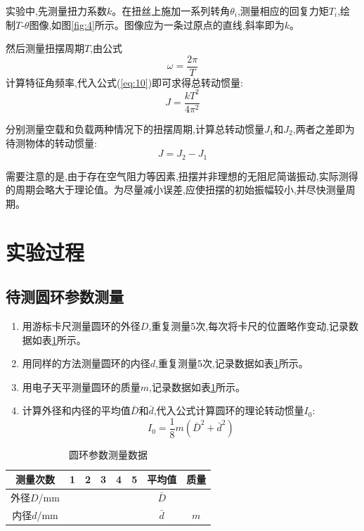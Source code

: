 \documentclass[UTF8]{ctexart}
\begin{document}
    实验中,先测量扭力系数$k$。在扭丝上施加一系列转角$\theta_i$,测量相应的回复力矩$T_i$,绘制$T$-$\theta$图像,如图\ref{fig:4}所示。图像应为一条过原点的直线,斜率即为$k$。
    
    然后测量扭摆周期$T$,由公式
    \begin{equation}
    \omega=\frac{2\pi}{T} \label{eq:11}
    \end{equation}
    计算特征角频率,代入公式(\ref{eq:10})即可求得总转动惯量:
    \begin{equation}
    J=\frac{kT^2}{4\pi^2} \label{eq:12}
    \end{equation}
    
    分别测量空载和负载两种情况下的扭摆周期,计算总转动惯量$J_1$和$J_2$,两者之差即为待测物体的转动惯量:
    \begin{equation}
    J=J_2-J_1 \label{eq:13}
    \end{equation}
    

    需要注意的是,由于存在空气阻力等因素,扭摆并非理想的无阻尼简谐振动,实际测得的周期会略大于理论值。为尽量减小误差,应使扭摆的初始振幅较小,并尽快测量周期。


    \section{实验过程}

    \subsection{待测圆环参数测量}
    
    \begin{enumerate}
    \item 用游标卡尺测量圆环的外径$D$,重复测量5次,每次将卡尺的位置略作变动,记录数据如表\ref{tab:1}所示。
    \item 用同样的方法测量圆环的内径$d$,重复测量5次,记录数据如表\ref{tab:1}所示。
    \item 用电子天平测量圆环的质量$m$,记录数据如表\ref{tab:1}所示。
    \item 计算外径和内径的平均值$\bar{D}$和$\bar{d}$,代入公式计算圆环的理论转动惯量$I_0$:
    \begin{equation}
    I_0=\frac{1}{8}m(\bar{D}^2+\bar{d}^2) \label{eq:14}
    \end{equation}
    \end{enumerate}
    
    \begin{table}[htbp]
    \centering
    \caption{圆环参数测量数据} \label{tab:1}
    \begin{tabular}{cccccccc}
    \hline
    测量次数 & 1 & 2 & 3 & 4 & 5 & 平均值 & 质量\\
    \hline
    外径$D$/mm &  &  &  &  &  & $\bar{D}$ & \\
    内径$d$/mm &  &  &  &  &  & $\bar{d}$ & $m$\\
    \hline
    \end{tabular}
    \end{table}
    
\end{document}
